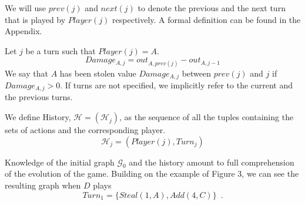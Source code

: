 \documentclass[11pt]{llncs}
\theoremstyle{definition}
\begin{document}
     We will use $prev\left(j\right)$ and $next\left(j\right)$ to denote the previous and the next turn that
     is played by $Player(j)$ respectively. A formal definition can be found in the Appendix.
     \begin{definition}[Damage]
        Let $j$ be a turn such that $Player\left(j\right) = A$.
        \begin{equation}
           Damage_{A, j} = out_{A, prev\left(j\right)} - out_{A, j-1}
        \end{equation}
        We say that $A$ has been stolen value $Damage_{A, j}$ between $prev\left(j\right)$ and $j$ if $Damage_{A, j} > 0$.
        If turns are not specified, we implicitly refer to the current and the previous turns.
     \end{definition}
     \begin{definition}[History]
        We define History, $\mathcal{H} = \left(\mathcal{H}_j\right)$, as the sequence of all the tuples containing the sets
        of actions and the corresponding player.
        \begin{equation}
           \mathcal{H}_j = \left(Player\left(j\right), Turn_j\right)
        \end{equation}
     \end{definition}
     Knowledge of the initial graph $\mathcal{G}_0$ and the history amount to full comprehension of the evolution of the
     game. Building on the example of Figure 3, we can see the resulting graph when $D$ plays
     \begin{equation}
     \label{turnexample}
        Turn_1 = \{Steal\left(1, A\right), Add\left(4, C\right)\} \enspace.
     \end{equation}
\end{document}
